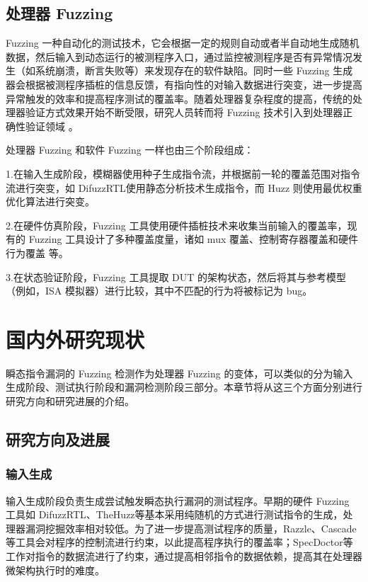 \subsection{处理器 Fuzzing}

Fuzzing 一种自动化的测试技术，它会根据一定的规则自动或者半自动地生成随机数据，然后输入到动态运行的被测程序入口，通过监控被测程序是否有异常情况发生（如系统崩溃，断言失败等）来发现存在的软件缺陷。同时一些 Fuzzing 生成器会根据被测程序插桩的信息反馈，有指向性的对输入数据进行突变，进一步提高异常触发的效率和提高程序测试的覆盖率。随着处理器复杂程度的提高，传统的处理器验证方式效果开始不断受限，研究人员转而将 Fuzzing 技术引入到处理器正确性验证领域 \cite{bruns2022efficient}\cite{canakci2021directfuzz}\cite{hur2021difuzzrtl}。\par

处理器 Fuzzing 和软件 Fuzzing 一样也由三个阶段组成：\par

1.在输入生成阶段，模糊器使用种子生成指令流，并根据前一轮的覆盖范围对指令流进行突变，如 DifuzzRTL\cite{hur2021difuzzrtl}使用静态分析技术生成指令，而 Huzz\cite{kande2022thehuzz} 则使用最优权重优化算法进行突变。\par

2.在硬件仿真阶段，Fuzzing 工具使用硬件插桩技术来收集当前输入的覆盖率，现有的 Fuzzing 工具设计了多种覆盖度量，诸如 mux 覆盖\cite{laeufer2018rfuzz}、控制寄存器覆盖\cite{hur2021difuzzrtl}和硬件行为覆盖\cite{kande2022thehuzz} 等。\par

3.在状态验证阶段，Fuzzing 工具提取 DUT 的架构状态，然后将其与参考模型（例如，ISA 模拟器）进行比较，其中不匹配的行为将被标记为 bug。

\section{国内外研究现状}

瞬态指令漏洞的 Fuzzing 检测作为处理器 Fuzzing 的变体，可以类似的分为输入生成阶段、测试执行阶段和漏洞检测阶段三部分。本章节将从这三个方面分别进行研究方向和研究进展的介绍。

\subsection{研究方向及进展}

\subsubsection{输入生成}
输入生成阶段负责生成尝试触发瞬态执行漏洞的测试程序。早期的硬件 Fuzzing 工具如 DifuzzRTL\cite{hur2021difuzzrtl}、TheHuzz\cite{kande2022thehuzz}等基本采用纯随机的方式进行测试指令的生成，处理器漏洞挖掘效率相对较低。为了进一步提高测试程序的质量，Razzle\cite{razzle}、Cascade\cite{soltcascade}等工具会对程序的控制流进行约束，以此提高程序执行的覆盖率；SpecDoctor\cite{hur2022specdoctor}等工作对指令的数据流进行了约束，通过提高相邻指令的数据依赖，提高其在处理器微架构执行时的难度。\par

